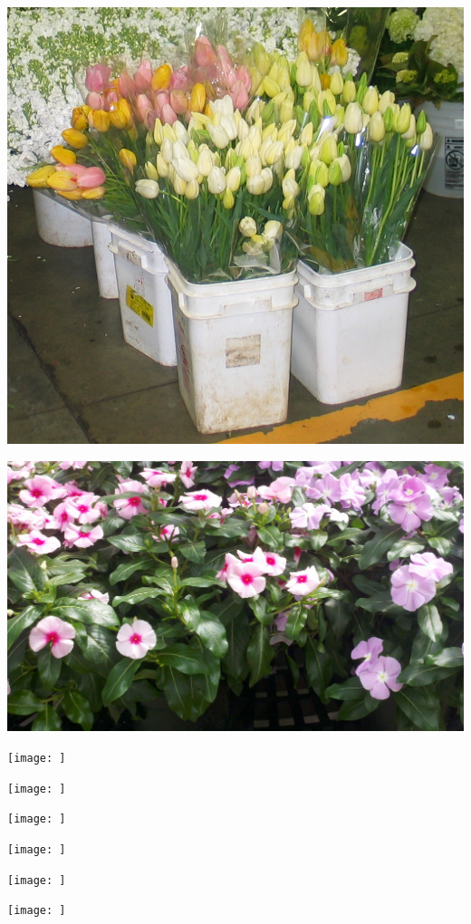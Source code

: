 \documentclass{article}
\begin{document}
\begin{center}
\includegraphics[width=0.9\textheight, angle=90]{../Tulips.jpg}
\end{center}
\newpage

\begin{center}
\includegraphics[width=0.9\textheight, angle=90]{../Vinca.jpg}
\end{center}
\newpage

\begin{center}
\texttt{[image:  ]}
\end{center}
\newpage

\begin{center}
\texttt{[image:  ]}
\end{center}
\newpage

\begin{center}
\texttt{[image:  ]}
\end{center}
\newpage

\begin{center}
\texttt{[image:  ]}
\end{center}
\newpage

\begin{center}
\texttt{[image:  ]}
\end{center}
\newpage

\begin{center}
\texttt{[image:  ]}
\end{center}
\newpage
\end{document}
